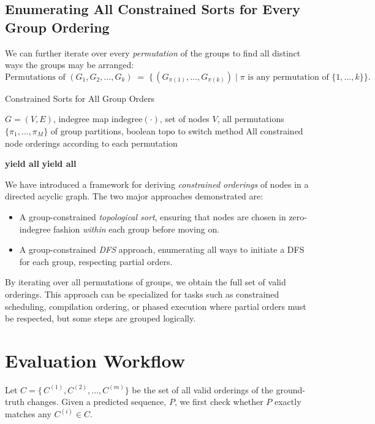 \subsection{Enumerating All Constrained Sorts for Every Group Ordering}
We can further iterate over every \emph{permutation} of the groups to find all distinct ways the groups may be arranged:
\[
  \text{Permutations of } (G_1, G_2, \dots, G_k) \;=\; \{\,(G_{\pi(1)}, \dots, G_{\pi(k)}) \;|\; \pi \text{ is any permutation of } \{1,\dots,k\}\}.
\]
\begin{algorithm}[H]
\caption{Constrained Sorts for All Group Orders}
\label{alg:constrained-sorts-all-group-orders}
\begin{algorithmic}[1]

\Require \(G = (V,E)\), \(\text{indegree}\) map \(\text{indegree}(\cdot)\), set of nodes \(V\),
        all permutations \(\{\pi_1,\dots,\pi_M\}\) of group partitions,
        boolean \(\text{topo}\) to switch method
\Ensure All constrained node orderings according to each permutation

        \State \textbf{yield all} 
    \Else
        \State \textbf{yield all} 
    \EndIf
\EndFor

\end{algorithmic}
\end{algorithm}

We have introduced a framework for deriving \emph{constrained orderings} of nodes in a directed acyclic graph. The two major approaches demonstrated are:
\begin{itemize}
    \item A group-constrained \emph{topological sort}, ensuring that nodes are chosen in zero-indegree fashion \emph{within} each group before moving on.
    \item A group-constrained \emph{DFS} approach, enumerating all ways to initiate a DFS for each group, respecting partial orders.
\end{itemize}
By iterating over all permutations of groups, we obtain the full set of valid orderings. This approach can be specialized for tasks such as constrained scheduling, compilation ordering, or phased execution where partial orders must be respected, but some steps are grouped logically.

\section{Evaluation Workflow}
Let $C = \{\,C^{(1)}, C^{(2)}, \dots, C^{(m)}\} $ be the set of all valid orderings of the ground-truth changes. Given a predicted sequence, $P$, we first check whether $P$ exactly matches any $C^{(i)} \in C$.


